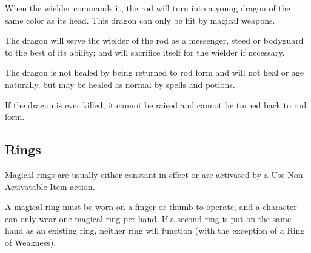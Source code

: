 \begin{multicols*}{2}
When the wielder commands it, the rod will turn into a young dragon of the same color as its head. This dragon can only be hit by magical weapons.

The dragon will serve the wielder of the rod as a messenger, steed or bodyguard to the best of its ability; and will sacrifice itself for the wielder if necessary.

The dragon is not healed by being returned to rod form and will not heal or age naturally, but may be healed as normal by spells and potions.

If the dragon is ever killed, it cannot be raised and cannot be turned back to rod form.

\subsection{Rings}
Magical rings are usually either constant in effect or are activated by a Use Non-Activatable Item action.

A magical ring must be worn on a finger or thumb to operate, and a character can only wear one magical ring per hand. If a second ring is put on the same hand as an existing ring, neither ring will function (with the exception of a Ring of Weakness).


\end{multicols*}
